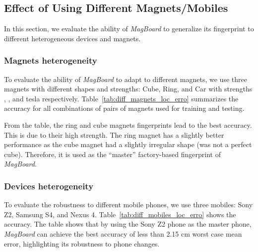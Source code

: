 \documentclass[conference]{IEEEtran}
\def \sys {\textit{MagBoard}}
\begin{document}
\subsection{Effect of Using Different Magnets/Mobiles}
In this section, we evaluate the ability of \sys{} to generalize its fingerprint to different heterogeneous devices and magnets.

\subsubsection{Magnets heterogeneity}
To evaluate the ability of \sys{} to adapt to different magnets, we use three magnets with different shapes and strengths: Cube, Ring, and Car with strengths , , and  tesla respectively. 
Table~\ref{tab:diff_magnets_loc_erro} summarizes the accuracy for all combinations of pairs of magnets used for training and testing. 

From the table, the ring and cube magnets fingerprints lead to the best accuracy. This is due to their high strength. The ring magnet has a slightly better performance as the cube magnet had a slightly irregular shape (was not a perfect cube). 
 Therefore, it is used as the ``master'' factory-based fingerprint of \sys{}. 

\subsubsection{Devices heterogeneity}
To evaluate the robustness to different mobile phones, we use three mobiles:  Sony Z2, Samsung S4, and Nexus 4. Table~\ref{tab:diff_mobiles_loc_erro} shows the accuracy. The table shows that by using the Sony Z2 phone as the master phone, \sys{} can achieve the best accuracy of less than 2.15 cm worst case mean error, highlighting its robustness to phone changes. 
\end{document}

